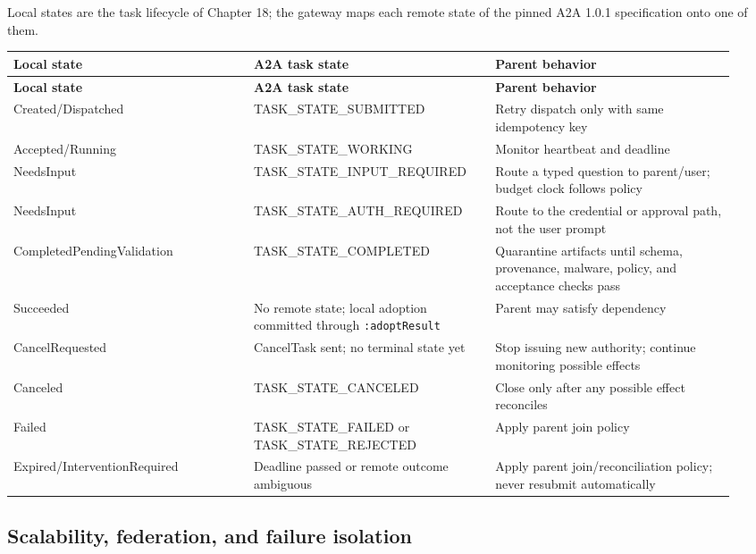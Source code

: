 Local states are the task lifecycle of Chapter 18; the gateway maps each remote state of the pinned A2A 1.0.1 specification onto one of them.\par

\BookTableStart
\small
\begin{longtable}{@{}Y{0.3133\linewidth}Y{0.3133\linewidth}Y{0.3133\linewidth}@{}}
\color{white}\bfseries \textbf{Local state} & \color{white}\bfseries \textbf{A2A task state} & \color{white}\bfseries \textbf{Parent behavior} \\
\endfirsthead
{}
\color{white}\bfseries \textbf{Local state} & \color{white}\bfseries \textbf{A2A task state} & \color{white}\bfseries \textbf{Parent behavior} \\
\endhead
Created/Dispatched & TASK\_STATE\_SUBMITTED & Retry dispatch only with same idempotency key \\
Accepted/Running & TASK\_STATE\_WORKING & Monitor heartbeat and deadline \\
NeedsInput & TASK\_STATE\_INPUT\_REQUIRED & Route a typed question to parent/user; budget clock follows policy \\
NeedsInput & TASK\_STATE\_AUTH\_REQUIRED & Route to the credential or approval path, not the user prompt \\
CompletedPendingValidation & TASK\_STATE\_COMPLETED & Quarantine artifacts until schema, provenance, malware, policy, and acceptance checks pass \\
Succeeded & No remote state; local adoption committed through \lstinline[style=bookinline]!:adoptResult! & Parent may satisfy dependency \\
CancelRequested & CancelTask sent; no terminal state yet & Stop issuing new authority; continue monitoring possible effects \\
Canceled & TASK\_STATE\_CANCELED & Close only after any possible effect reconciles \\
Failed & TASK\_STATE\_FAILED or TASK\_STATE\_REJECTED & Apply parent join policy \\
Expired/InterventionRequired & Deadline passed or remote outcome ambiguous & Apply parent join/reconciliation policy; never resubmit automatically \\
\end{longtable}
\BookTableEnd

\subsection{Scalability, federation, and failure isolation}

